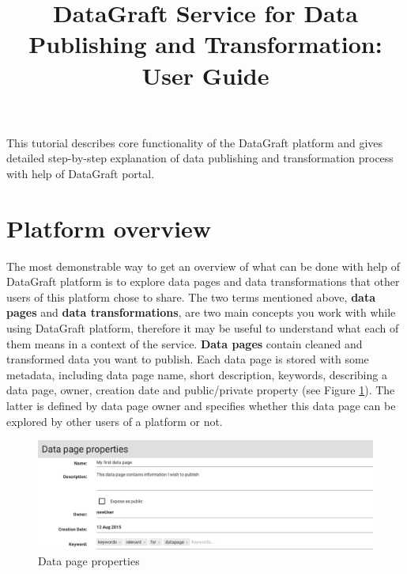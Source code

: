 \documentclass[USenglish]{article}
\title{DataGraft Service for Data Publishing and Transformation: User Guide}
\date{}
\begin{document}
 \maketitle{}
This tutorial describes core functionality of the DataGraft platform and gives detailed step-by-step explanation of data publishing and transformation process with help of DataGraft portal.

\section{Platform overview}
The most demonstrable way to get an overview of what can be done with help of DataGraft platform is to explore data pages and data transformations that other users of this platform chose to share. The two terms mentioned above, \textbf{data pages} and \textbf{data transformations}, are two main concepts you work with while using DataGraft platform, therefore it may be useful to understand what each of them means in a context of the service. 
\newline
\newline
\textbf{Data pages} contain cleaned and transformed data you want to publish. Each data page is stored with some metadata, including data page name, short description, keywords, describing a data page, owner, creation date and public/private property (see Figure \ref{datapagemeta}). The latter is defined by data page owner and specifies whether this data page can be explored by other users of a platform or not. 


\begin{center}
\begin{figure}[!htbp]
\centering
\includegraphics[height=4 cm] {datapagemeta.png}
 \caption{Data page properties \label{datapagemeta}}
\end{figure}
\end{center}
\end{document}
